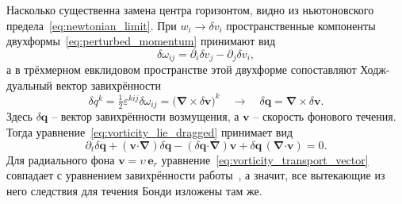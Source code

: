 \documentclass[12pt,a4paper,preprint,nopreprintline]{elsarticle}
\begin{document}
Насколько существенна замена центра горизонтом, видно из ньютоновского предела~\eqref{eq:newtonian_limit}. При $w_{i}\rightarrow\delta v_{i}$ пространственные компоненты двухформы~\eqref{eq:perturbed_momentum} принимают вид
\begin{equation}
    \delta\omega_{ij}
    =
    \partial_{i}\delta v_{j}
    -
    \partial_{j}\delta v_{i},
    \label{eq:vorticity_newtonian_components}
\end{equation}
а в трёхмерном евклидовом пространстве этой двухформе сопоставляют Ходж-дуальный вектор завихрённости
\begin{equation}
    \delta q^{k}
    =
    \tfrac{1}{2}\varepsilon^{kij}\delta\omega_{ij}
    =
    \bigl(\boldsymbol{\nabla}\times\delta\boldsymbol{v}\bigr)^{k}
    \quad\to\quad
    \delta\boldsymbol{q}
    =
    \boldsymbol{\nabla}\times\delta\boldsymbol{v}.
    \label{eq:vorticity_newtonian}
\end{equation}
Здесь $\delta\boldsymbol{q}$ -- вектор завихрённости возмущения, а $\boldsymbol{v}$ -- скорость фонового течения. Тогда уравнение~\eqref{eq:vorticity_lie_dragged} принимает вид
\begin{equation}
    \partial_{t}\delta\boldsymbol{q}
    +
    (\boldsymbol{v}\boldsymbol{\cdot}\boldsymbol{\nabla})
        \delta\boldsymbol{q}
    -
    (\delta\boldsymbol{q}\boldsymbol{\cdot}\boldsymbol{\nabla})
        \boldsymbol{v}
    +
    \delta\boldsymbol{q}\,
        (\boldsymbol{\nabla}\boldsymbol{\cdot}\boldsymbol{v})
    =0.
    \label{eq:vorticity_transport_vector}
\end{equation}
Для радиального фона $\boldsymbol{v}=\upsilon\,\boldsymbol{e}_{r}$ уравнение~\eqref{eq:vorticity_transport_vector} совпадает с уравнением завихрённости работы~\cite{KovalenkoIG_EreminMA_SpatialInstabilityOfSphericalAccretion_1998}, а значит, все вытекающие из него следствия для течения Бонди изложены там же.
\end{document}

